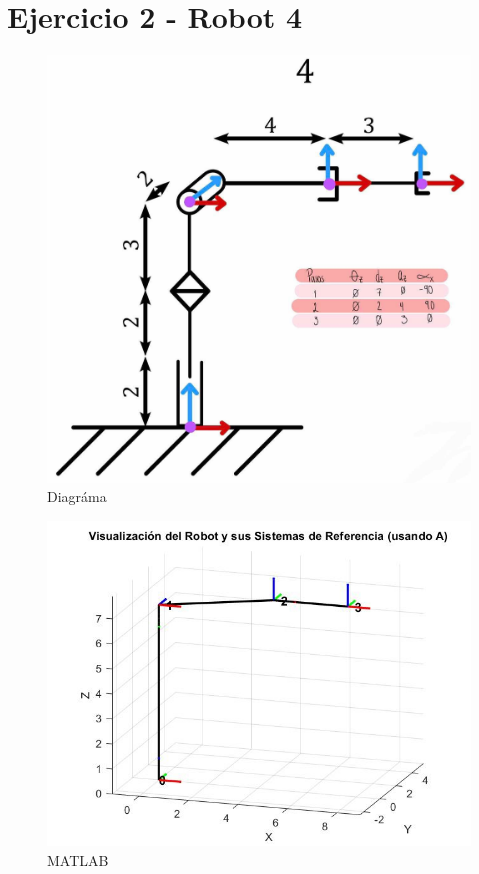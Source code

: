 \newpage
\section{Ejercicio 2 - Robot 4}
\begin{figure}[h]
	\centering
	\includegraphics[width=0.58\linewidth]{../img/ejercicio_4-dibujo}
	\caption{Diagráma}
	\label{fig:ejercicio4-dibujo}
\end{figure}

\begin{figure}[h]
	\centering
	\includegraphics[width=0.58\linewidth]{../img/ejercicio_4-matlab}
	\caption{MATLAB}
	\label{fig:ejercicio4-matlab}
\end{figure}
